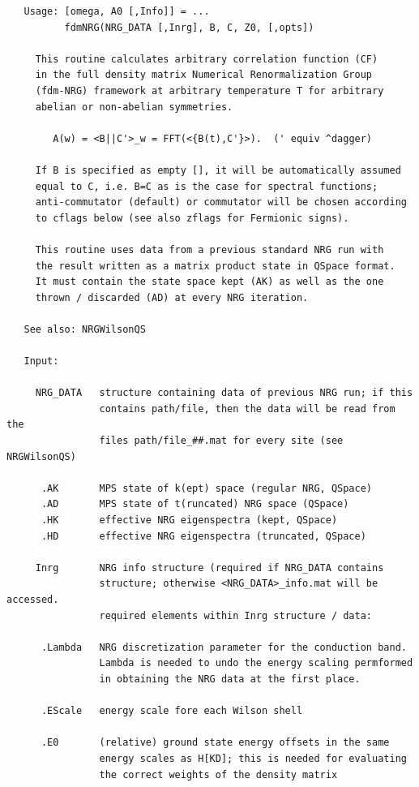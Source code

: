\documentclass[twoside,12pt]{article}
\begin{document}
\begin{verbatim}
   Usage: [omega, A0 [,Info]] = ...
          fdmNRG(NRG_DATA [,Inrg], B, C, Z0, [,opts])
 
     This routine calculates arbitrary correlation function (CF)
     in the full density matrix Numerical Renormalization Group
     (fdm-NRG) framework at arbitrary temperature T for arbitrary
     abelian or non-abelian symmetries.
 
        A(w) = <B||C'>_w = FFT(<{B(t),C'}>).  (' equiv ^dagger)
 
     If B is specified as empty [], it will be automatically assumed
     equal to C, i.e. B=C as is the case for spectral functions;
     anti-commutator (default) or commutator will be chosen according
     to cflags below (see also zflags for Fermionic signs).
 
     This routine uses data from a previous standard NRG run with
     the result written as a matrix product state in QSpace format.
     It must contain the state space kept (AK) as well as the one
     thrown / discarded (AD) at every NRG iteration.
 
   See also: NRGWilsonQS
 
   Input:
 
     NRG_DATA   structure containing data of previous NRG run; if this
                contains path/file, then the data will be read from the
                files path/file_##.mat for every site (see NRGWilsonQS)
 
      .AK       MPS state of k(ept) space (regular NRG, QSpace)
      .AD       MPS state of t(runcated) NRG space (QSpace)
      .HK       effective NRG eigenspectra (kept, QSpace)
      .HD       effective NRG eigenspectra (truncated, QSpace)
 
     Inrg       NRG info structure (required if NRG_DATA contains
                structure; otherwise <NRG_DATA>_info.mat will be accessed.
                required elements within Inrg structure / data:
 
      .Lambda   NRG discretization parameter for the conduction band.
                Lambda is needed to undo the energy scaling permformed
                in obtaining the NRG data at the first place.
              
      .EScale   energy scale fore each Wilson shell
              
      .E0       (relative) ground state energy offsets in the same
                energy scales as H[KD]; this is needed for evaluating
                the correct weights of the density matrix
 

\end{verbatim}
\end{document}
